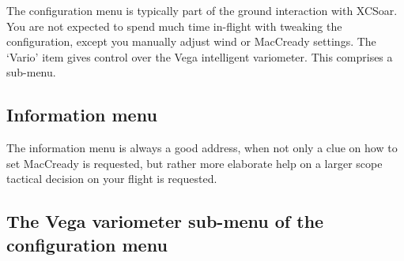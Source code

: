The configuration menu is typically part of the ground interaction with 
XCSoar. You are not expected to spend much time in-flight with tweaking 
the configuration, except you manually adjust wind or MacCready settings. 
The `Vario' item gives control over the  Vega intelligent variometer. This 
comprises a sub-menu.


\subsection*{Information menu}
\noindent{}

The information menu is always a good address, when not only a clue on 
how to set MacCready is requested, but rather more elaborate help on a 
larger scope tactical decision on your flight is requested.


\subsection*{The Vega variometer sub-menu of the configuration menu}

\noindent{}

